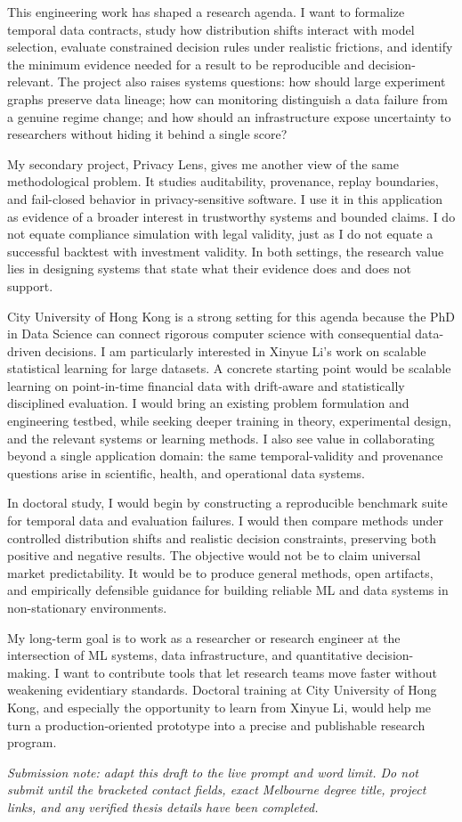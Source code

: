 \documentclass[11pt]{article}
\begin{document}
This engineering work has shaped a research agenda. I want to formalize temporal data contracts, study how distribution shifts interact with model selection, evaluate constrained decision rules under realistic frictions, and identify the minimum evidence needed for a result to be reproducible and decision-relevant. The project also raises systems questions: how should large experiment graphs preserve data lineage; how can monitoring distinguish a data failure from a genuine regime change; and how should an infrastructure expose uncertainty to researchers without hiding it behind a single score?

My secondary project, Privacy Lens, gives me another view of the same methodological problem. It studies auditability, provenance, replay boundaries, and fail-closed behavior in privacy-sensitive software. I use it in this application as evidence of a broader interest in trustworthy systems and bounded claims. I do not equate compliance simulation with legal validity, just as I do not equate a successful backtest with investment validity. In both settings, the research value lies in designing systems that state what their evidence does and does not support.

City University of Hong Kong is a strong setting for this agenda because the PhD in Data Science can connect rigorous computer science with consequential data-driven decisions. I am particularly interested in Xinyue Li's work on scalable statistical learning for large datasets. A concrete starting point would be scalable learning on point-in-time financial data with drift-aware and statistically disciplined evaluation. I would bring an existing problem formulation and engineering testbed, while seeking deeper training in theory, experimental design, and the relevant systems or learning methods. I also see value in collaborating beyond a single application domain: the same temporal-validity and provenance questions arise in scientific, health, and operational data systems.

In doctoral study, I would begin by constructing a reproducible benchmark suite for temporal data and evaluation failures. I would then compare methods under controlled distribution shifts and realistic decision constraints, preserving both positive and negative results. The objective would not be to claim universal market predictability. It would be to produce general methods, open artifacts, and empirically defensible guidance for building reliable ML and data systems in non-stationary environments.

My long-term goal is to work as a researcher or research engineer at the intersection of ML systems, data infrastructure, and quantitative decision-making. I want to contribute tools that let research teams move faster without weakening evidentiary standards. Doctoral training at City University of Hong Kong, and especially the opportunity to learn from Xinyue Li, would help me turn a production-oriented prototype into a precise and publishable research program.

\textit{Submission note: adapt this draft to the live prompt and word limit. Do not submit until the bracketed contact fields, exact Melbourne degree title, project links, and any verified thesis details have been completed.}
\end{document}
